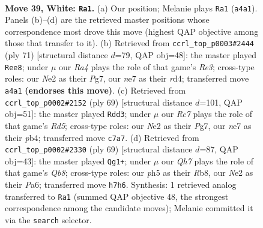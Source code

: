 \documentclass[11pt]{article}
\begin{document}
\clearpage

\begin{figure}[p]\centering
\begin{subfigure}{0.46\textwidth}\centering
\resizebox{\linewidth}{!}{%
\newchessgame
\chessboard[
  setfen={1r6/2R1n2Q/p2p1kp1/3qr2p/Rp2p2P/8/4NPP1/5K2 w - - 4 39},
  showmover=false,
  pgfstyle=straightmove, color=movearrow, markmove={a4-a1}
]}
\caption{}
\end{subfigure}\hfill
\begin{subfigure}{0.46\textwidth}\centering
\resizebox{\linewidth}{!}{%
\newchessgame
\chessboard[
  setfen={3r2k1/5pp1/4r3/1p2P2p/3R1P2/2Q4P/2R3PK/5q2 b - - 5 36},
  showmover=false,
  pgfstyle=straightmove, color=movearrow, markmove={e6-e8}
]}
\caption{}
\end{subfigure}
\\[4pt]
\begin{subfigure}{0.46\textwidth}\centering
\resizebox{\linewidth}{!}{%
\newchessgame
\chessboard[
  setfen={8/6pk/pp6/7p/1P1rn3/Pr5P/R4PPK/R2N4 b - - 7 35},
  showmover=false,
  pgfstyle=straightmove, color=movearrow, markmove={d4-d3}
]}
\caption{}
\end{subfigure}\hfill
\begin{subfigure}{0.46\textwidth}\centering
\resizebox{\linewidth}{!}{%
\newchessgame
\chessboard[
  setfen={1r3k2/5pp1/p7/3PR1Q1/3K4/2P3P1/PP1R3r/1q6 b - - 12 35},
  showmover=false,
  pgfstyle=straightmove, color=movearrow, markmove={b1-g1}
]}
\caption{}
\end{subfigure}
\caption{\textbf{Move 39, White: \texttt{Ra1}.} (a) Our position; Melanie plays \texttt{Ra1} (\texttt{a4a1}). Panels (b)--(d) are the retrieved master positions whose correspondence most drove this move (highest QAP objective among those that transfer to it). (b) Retrieved from \texttt{ccrl\_top\_p0003\#2444} (ply 71) [structural distance $d$=79, QAP obj=48]: the master played \texttt{Ree8}; under $\mu$ our \emph{Ra4} plays the role of that game's \emph{Re3}; cross-type roles: our \emph{N}e2 as their \emph{P}g7, our \emph{n}e7 as their \emph{r}d4; transferred move \texttt{a4a1} \textbf{(endorses this move)}. (c) Retrieved from \texttt{ccrl\_top\_p0002\#2152} (ply 69) [structural distance $d$=101, QAP obj=51]: the master played \texttt{Rdd3}; under $\mu$ our \emph{Rc7} plays the role of that game's \emph{Rd5}; cross-type roles: our \emph{N}e2 as their \emph{P}g7, our \emph{n}e7 as their \emph{p}b4; transferred move \texttt{c7a7}. (d) Retrieved from \texttt{ccrl\_top\_p0002\#2330} (ply 69) [structural distance $d$=87, QAP obj=43]: the master played \texttt{Qg1+}; under $\mu$ our \emph{Qh7} plays the role of that game's \emph{Qb8}; cross-type roles: our \emph{p}h5 as their \emph{R}b8, our \emph{N}e2 as their \emph{P}a6; transferred move \texttt{h7h6}. Synthesis: 1 retrieved analog transferred to \texttt{Ra1} (summed QAP objective 48, the strongest correspondence among the candidate moves); Melanie committed it via the \texttt{search} selector.}
\label{fig:thought-m76}
\end{figure}
\end{document}
